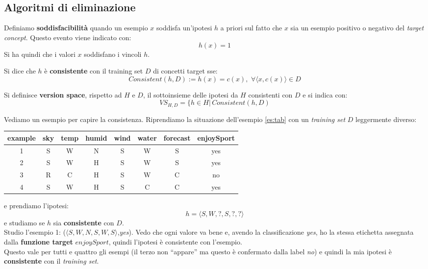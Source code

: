 \subsection{Algoritmi di eliminazione}
\begin{definizione}
  Definiamo \textbf{soddisfacibilità} quando un esempio $x$ soddisfa un'ipotesi
  $h$ a priori sul fatto che $x$ sia un esempio positivo o negativo del
  \textit{target concept}. Questo evento viene indicato con:
  \[h(x)=1\]
  Si ha quindi che i valori $x$ soddisfano i vincoli $h$. 
\end{definizione}
\begin{definizione}
  Si dice che $h$ è \textbf{consistente} con il training set $D$ di concetti
  target sse: 
  \[Consistent(h,D):=h(x)=c(x),\,\,\forall \langle x,c(x)\rangle\in D\]
\end{definizione}
\begin{definizione}
  Si definisce \textbf{version space}, rispetto ad $H$ e $D$, il
  sottoinsieme delle ipotesi da $H$ consistenti con $D$ e si indica con:
  \[VS_{H,D}=\{h\in H|\,Consistent(h,D)\]
\end{definizione}
\begin{esempio}
  Vediamo un esempio per capire la consistenza. Riprendiamo la situazione
  dell'esempio \ref{es:tab} con un \textit{training set} $D$ leggermente
  diverso: 
  \begin{table}[H]
    \centering
    \begin{tabular}[H]{|c|c|c|c|c|c|c|c|}
      \hline
      \textbf{example} & \textbf{sky} & \textbf{temp} & \textbf{humid}
      & \textbf{wind} & \textbf{water} & \textbf{forecast} &
      \textbf{enjoySport}\\
      \hline
      1 & S & W & N & S & W & S & \color{darkgreen} yes\\
      2 & S & W & H & S & W & S & \color{darkgreen} yes\\
      3 & R & C & H & S & W & C & \color{red} no\\
      4 & S & W & H & S & C & C & \color{darkgreen} yes\\
      \hline
    \end{tabular}
  \end{table}
  e prendiamo l'ipotesi:
  \[h=\langle S,W, ?, S, ?, ?\rangle\]
  e studiamo se $h$ sia \textbf{consistente} con $D$.\\
  Studio l'esempio 1: ($\langle S,W, N, S, W, S\rangle$,\textit{yes}). Vedo che
  ogni valore va bene e, avendo la classificazione 
  \textit{yes}, ho la stessa etichetta assegnata dalla \textbf{funzione target}
  $enjoySport$, quindi l'ipotesi è consistente con l'esempio. \\
  Questo vale per tutti e quattro gli esempi (il terzo non ``appare'' ma questo
  è confermato dalla label \textit{no}) e quindi la mia ipotesi è
  \textbf{consistente} con il \textit{training set}.
\end{esempio}

